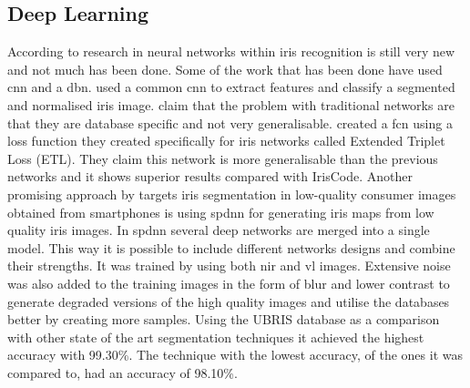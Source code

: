 \subsection{Deep Learning}
According to \cite{Zhao2017} research in neural networks within iris recognition is still very new and not much has been done. Some of the work that has been done have used \gls{cnn} and a \gls{dbn}. \cite{Al-Waisy2017} used a common \gls{cnn} to extract features and classify a segmented and normalised iris image. \cite{Zhao2017} claim that the problem with traditional networks are that they are database specific and not very generalisable. \cite{Zhao2017} created a \gls{fcn} using a loss function they created specifically for iris networks called Extended Triplet Loss (ETL). They claim this network is more generalisable than the previous networks and it shows superior results compared with IrisCode. Another promising approach by \cite{Bazrafkan2017} targets iris segmentation in low-quality consumer images obtained from smartphones is using \gls{spdnn} for generating iris maps from low quality iris images.  In \gls{spdnn} several deep networks are merged into a single model. This way it is possible to include different networks designs and combine their strengths. It was trained by using both \gls{nir} and \gls{vl} images. Extensive noise was also added to the training images in the form of blur and lower contrast to generate degraded versions of the high quality images and utilise the databases better by creating more samples. Using the UBRIS database as a comparison with other state of the art segmentation techniques it achieved the highest accuracy with 99.30\%. The technique with the lowest accuracy, of the ones it was compared to, had an accuracy of 98.10\%.   









